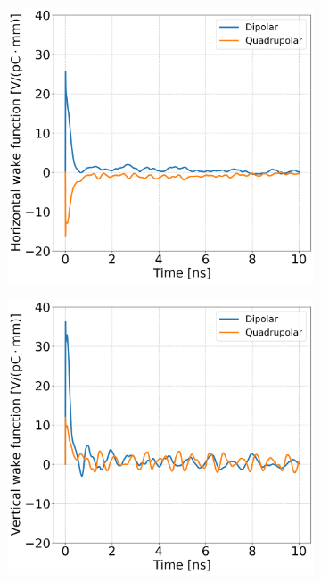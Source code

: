  \begin{figure}[!ht]
    \centering
    \begin{subfigure}[t]{0.45\textwidth}
        \centering
        \includegraphics[width=1\textwidth]{images/Ch7/Q26_complete_SPS_model_wakefunctions_H_plane.png}
    \end{subfigure}
    \hfill
    \begin{subfigure}[t]{0.45\textwidth}
        \centering
        \includegraphics[width=1\textwidth]{images/Ch7/Q26_complete_SPS_model_wakefunctions_V_plane.png}

\end{subfigure}
\end{figure}
